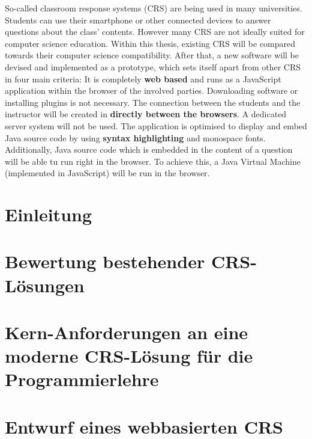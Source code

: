 \documentclass[draft=false
              ,paper=a4
              ,twoside=false
              ,fontsize=11pt
              ,headsepline
              ,BCOR=10mm
              ]{scrbook}
\begin{document}
{So-called classroom response systems (CRS) are being used in many universities. Students can use their smartphone or other connected devices to answer questions about the class' contents. However many CRS are not ideally suited for computer science education. Within this thesis, existing CRS will be compared towards their computer science compatibility. After that, a new software will be devised and implemented as a prototype, which sets itself apart from other CRS in four main criteria:\newline
It is completely \textbf{web based} and runs as a JavaScript application within the browser of the involved parties. Downloading software or installing plugins is not necessary.\newline
The connection between the students and the instructor will be created in \textbf{directly between the browsers}. A dedicated server system will not be used.\newline
The application is optimised to display and embed Java source code by using \textbf{syntax highlighting} and monospace fonts.\newline
Additionally, Java source code which is embedded in the content of a question will be able tu run right in the browser. To achieve this, a Java Virtual Machine (implemented in JavaScript) will be run in the browser.}
\newpage
\singlespacing

\setcounter{tocdepth}{3}
\tableofcontents
\newpage
\listoftables
\listoffigures
\lstlistoflistings


\mainmatter
\onehalfspacing

\chapter{Einleitung}

\label{chap:einleitung}
%
\chapter{Bewertung bestehender CRS-Lösungen}
\label{chap:bewertung}

%
\chapter{Kern-Anforderungen an eine moderne CRS-Lösung für die Programmierlehre}
\label{chap:anforderungen}

%
\chapter{Entwurf eines webbasierten CRS}
\label{chap:entwurf}

%
\end{document}
